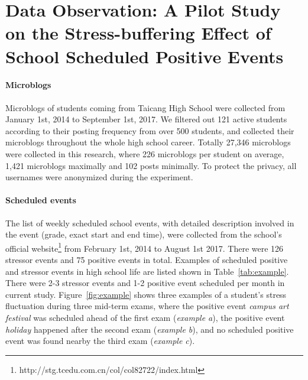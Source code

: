 \section{Data Observation: A Pilot Study on the Stress-buffering Effect of School Scheduled Positive Events}
\label{sec:obs}
\paragraph{Microblogs} Microblogs of students coming from Taicang High School were collected from January 1st, 2014 to September 1st, 2017.
We filtered out 121 active students according to their posting frequency from over 500 students,
and collected their microblogs throughout the whole high school career.
Totally 27,346 microblogs were collected in this research,
where 226 microblogs per student on average, 1,421 microblogs maximally and 102 posts minimally.
To protect the privacy, all usernames were anonymized during the experiment.

\paragraph{Scheduled events} The list of weekly scheduled school events,
with detailed description involved in the event (grade, exact start and end time),
were collected from the school's official website\footnote{http://stg.tcedu.com.cn/col/col82722/index.html} from February 1st, 2014 to August 1st 2017.
There were 126 stressor events and 75 positive events in total.
Examples of scheduled positive and stressor events in high school life are listed shown in Table~\ref{tab:example}.
There were 2-3 stressor events and 1-2 positive event scheduled per month in current study.
Figure~\ref{fig:example} shows three examples of a student's stress fluctuation during three mid-term exams,
where the positive event \emph{campus art festival} was scheduled ahead of the first exam (\emph{example a}),
the positive event \emph{holiday} happened after the second exam (\emph{example b}),
and no scheduled positive event was found nearby the third exam (\emph{example c}).


\begin{table}[H]
\caption{\small{Examples of school scheduled positive and stressor events.}}
\label{tab:example}
\end{table}

